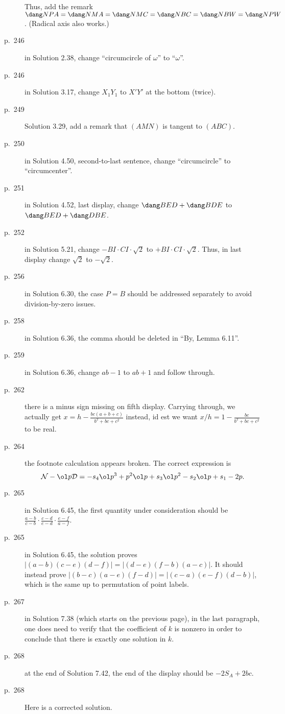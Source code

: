 \documentclass[11pt]{scrartcl}
\begin{document}
\begin{description}
{  Thus, add the remark $\dang NPA = \dang NMA = \dang NMC = \dang NBC = \dang NBW = \dang NPW$.}
  (Radical axis also works.)
\item[p.\  246] in Solution 2.38, change ``circumcircle of $\omega$'' to ``$\omega$''.
\item[p.\  246] in Solution 3.17, change $X_1Y_1$ to $X'Y'$ at the bottom (twice).
\item[p.\  249] Solution 3.29, add a remark that $(AMN)$ is tangent to $(ABC)$.
\item[p.\  250] in Solution 4.50, second-to-last sentence,
  change ``circumcircle'' to ``circumcenter''.
\item[p.\  251] in Solution 4.52, last display,
  change $\dang BED + \dang BDE$ to $\dang BED + \dang DBE$.
\item[p.\  252] in Solution 5.21, change $-BI \cdot CI \cdot \sqrt2$ to $+ BI \cdot CI \cdot \sqrt2$.
  Thus, in last display change $\sqrt2$ to $-\sqrt2$.
\item[p.\  256] in Solution 6.30, the case $P=B$ should be addressed separately
  to avoid division-by-zero issues.
\item[p.\  258] in Solution 6.36, the comma should be deleted in ``By, Lemma 6.11''.
\item[p.\  259] in Solution 6.36, change $ab-1$ to $ab+1$ and follow through.
\item[p.\  262] there is a minus sign missing on fifth display.
  Carrying through, we actually get $x = h - \frac{bc(a+b+c)}{b^2+bc+c^2}$ instead,
  id est we want $x/h = 1 - \frac{bc}{b^2+bc+c^2}$ to be real.
\item[p.\  264] the footnote calculation appears broken. The correct expression is
  \[ \mathcal{N} - \ol p \mathcal{D}
    = -s_4 \ol p^3 + p^2 \ol p + s_3 \ol p^2 - s_2 \ol p + s_1 - 2 p.  \]
\item[p.\  265] in Solution 6.45, the first quantity under consideration should be
  $\frac{a-b}{c-b}\cdot\frac{c-d}{e-d}\cdot\frac{e-f}{a-f}$.
\item[p.\  265] in Solution 6.45, the solution proves $|(a-b)(c-e)(d-f)|=|(d-e)(f-b)(a-c)|$.
  It should instead prove $|(b-c)(a-e)(f-d)|=|(c-a)(e-f)(d-b)|$,
  which is the same up to permutation of point labels.
\item[p.\  267] in Solution 7.38 (which starts on the previous page),
  in the last paragraph, one does need to verify that the coefficient of $k$ is nonzero
  in order to conclude that there is exactly one solution in $k$.
\item[p.\  268] at the end of Solution 7.42, the end of the display should be $-2S_A+2bc$.
\item[p.\  268] 
  Here is a corrected solution.


\end{description}
\end{document}
